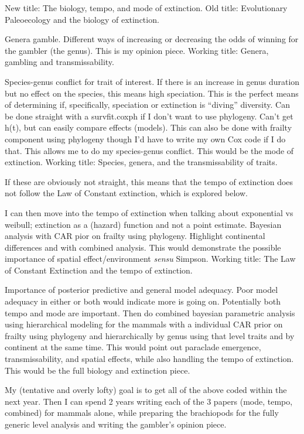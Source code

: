 \documentclass[12pt,letterpaper]{article}
\begin{document}
New title: The biology, tempo, and mode of extinction.
Old title: Evolutionary Paleoecology and the biology of extinction.


Genera gamble. Different ways of increasing or decreasing the odds of winning for the gambler (the genus). This is my opinion piece. Working title: Genera, gambling and transmissability.

Species-genus conflict for trait of interest. If there is an increase in genus duration but no effect on the species, this means high speciation. This is the perfect means of determining if, specifically, speciation or extinction is ``diving'' diversity. Can be done straight with a survfit.coxph if I don't want to use phylogeny. Can't get h(t), but can easily compare effects (models). This can also be done with frailty component using phylogeny though I'd have to write my own Cox code if I do that. This allows me to do my species-genus conflict. This would be the mode of extinction. Working title: Species, genera, and the transmissability of traits. 

If these are obviously not straight, this means that the tempo of extinction does not follow the Law of Constant extinction, which is explored below.

I can then move into the tempo of extinction when talking about exponential vs weibull; extinction as a (hazard) function and not a point estimate. Bayesian analysis with CAR pior on frailty using phylogeny. Highlight continental differences and with combined analysis. This would demonstrate the possible importance of spatial effect/environment \textit{sensu} Simpson. Working title: The Law of Constant Extinction and the tempo of extinction.

Importance of posterior predictive and general model adequacy. Poor model adequacy in either or both would indicate more is going on. Potentially both tempo and mode are important. Then do combined bayesian parametric analysis using hierarchical modeling for the mammals with a individual CAR prior on frailty using phylogeny and hierarchically by genus using that level traits and by continent at the same time. This would point out paraclade emergence, transmissability, and spatial effects, while also handling the tempo of extinction. This would be the full biology and extinction piece.

My (tentative and overly lofty) goal is to get all of the above coded within the next year. Then I can spend 2 years writing each of the 3 papers (mode, tempo, combined) for mammals alone, while preparing the brachiopods for the fully generic level analysis and writing the gambler's opinion piece.
\end{document}
